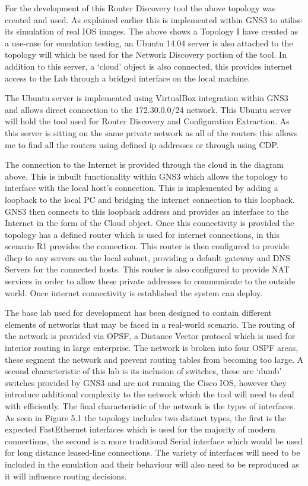 \documentclass[11pt]{report}
\begin{document}
For the development of this Router Discovery tool the above topology was created and used. As explained earlier this is implemented within GNS3 to utilise its simulation of real IOS images. The above shows a Topology I have created as a use-case for emulation testing, an Ubuntu 14.04 server is also attached to the topology will which be used for the Network Discovery portion of the tool. In addition to this server, a `cloud' object is also connected, this provides internet access to the Lab through a bridged interface on the local machine.

The Ubuntu server is implemented using VirtualBox integration within GNS3 and allows direct connection to the 172.30.0.0/24 network. This Ubuntu server will hold the tool used for Router Discovery and Configuration Extraction. As this server is sitting on the same private network as all of the routers this allows me to find all the routers using defined ip addresses or through using CDP.

The connection to the Internet is provided through the cloud in the diagram above. This is inbuilt functionality within GNS3 which allows the topology to interface with the local host’s connection. This is implemented by adding a loopback to the local PC and bridging the internet connection to this loopback. GNS3 then connects to this loopback address and provides an interface to the Internet in the form of the Cloud object. Once this connectivity is provided the topology has a defined router which is used for internet connections, in this scenario R1 provides the connection. This router is then configured to provide dhcp to any servers on the local subnet, providing a default gateway and DNS Servers for the connected hosts. This router is also configured to provide NAT services in order to allow these private addresses to communicate to the outside world. Once internet connectivity is established the system can deploy.

The base lab used for development has been designed to contain different elements of networks that may be faced in a real-world scenario. The routing of the network is provided via OPSF, a Distance Vector protocol which is used for interior routing in large enterprise. The network is broken into four OSPF areas, these segment the network and prevent routing tables from becoming too large. A second characteristic of this lab is its inclusion of switches, these are `dumb' switches provided by GNS3 and are not running the Cisco IOS, however they introduce additional complexity to the network which the tool will need to deal with efficiently. The final characteristic of the network is the types of interfaces. As seen in Figure 5.1 the topology includes two distinct types, the first is the expected FastEthernet interfaces which is used for the majority of modern connections, the second is a more traditional Serial interface which would be used for long distance leased-line connections. The variety of interfaces will need to be included in the emulation and their behaviour will also need to be reproduced as it will influence routing decisions.
\end{document}
